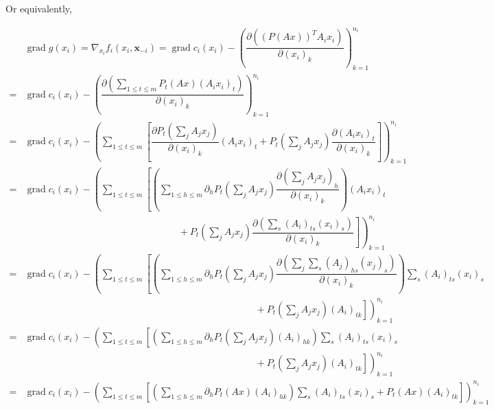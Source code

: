 Or equivalently,

\begingroup
\allowdisplaybreaks
\begin{align*}
& \operatorname{grad} g(x_i) = \nabla_{x_i} f_i(x_i, \mathbf{x}_{-i}) = \operatorname{grad} c_i(x_i) - \left( \dfrac{\partial \left( (P(Ax))^T A_ix_i \right)}{\partial (x_i)_k} \right)_{k=1}^{n_i} \\
= & \operatorname{grad} c_i(x_i) - \left( \dfrac{\partial \left( \sum\limits_{1\leqslant t \leqslant m} P_t(Ax) (A_ix_i)_t \right)}{\partial (x_i)_k} \right)_{k=1}^{n_i} \\
= & \operatorname{grad} c_i(x_i) - \left( \sum\limits_{1\leqslant t \leqslant m} \left[ \dfrac{\partial P_t \left( \sum\limits_j A_jx_j \right)}{\partial (x_i)_k} (A_ix_i)_t + P_t \left( \sum\limits_j A_jx_j \right) \dfrac{\partial (A_ix_i)_t}{\partial (x_i)_k} \right] \right)_{k=1}^{n_i} \\
= & \operatorname{grad} c_i(x_i) - \left( \sum\limits_{1\leqslant t \leqslant m} \left[ \left( \sum\limits_{1\leqslant h \leqslant m} \partial_h P_t\left( \sum\limits_j A_jx_j \right) \dfrac{\partial \left( \sum\limits_j A_jx_j \right)_h}{\partial (x_i)_k} \right) (A_ix_i)_t \right.\right. \\
& \left.\left. \hspace{16em} + P_t \left( \sum\limits_j A_jx_j \right) \dfrac{\partial \left( \sum\limits_{s} (A_i)_{ts} (x_i)_s \right)}{\partial (x_i)_k} \right] \right)_{k=1}^{n_i} \\
= & \operatorname{grad} c_i(x_i) - \left( \sum\limits_{1\leqslant t \leqslant m} \left[ \left( \sum\limits_{1\leqslant h \leqslant m} \partial_h P_t\left( \sum\limits_j A_jx_j \right) \dfrac{\partial \left( \sum\limits_j\sum\limits_s (A_j)_{hs} (x_j)_s \right)}{\partial (x_i)_k} \right) \sum\limits_s (A_i)_{ts} (x_i)_s \right.\right. \\
& \left.\left. \hspace{24em} + P_t \left( \sum\limits_j A_jx_j \right) (A_i)_{tk} \right] \right)_{k=1}^{n_i} \\
= & \operatorname{grad} c_i(x_i) - \left( \sum\limits_{1\leqslant t \leqslant m} \left[ \left( \sum\limits_{1\leqslant h \leqslant m} \partial_h P_t\left( \sum\limits_j A_jx_j \right) (A_i)_{hk} \right) \sum\limits_s (A_i)_{ts} (x_i)_s \right.\right. \\
& \left.\left. \hspace{24em} + P_t \left( \sum\limits_j A_jx_j \right) (A_i)_{tk} \right] \right)_{k=1}^{n_i} \\
= & \operatorname{grad} c_i(x_i) - \left( \sum\limits_{1\leqslant t \leqslant m} \left[ \left( \sum\limits_{1\leqslant h \leqslant m} \partial_h P_t\left( Ax \right) (A_i)_{hk} \right) \sum\limits_s (A_i)_{ts} (x_i)_s + P_t \left( Ax \right) (A_i)_{tk} \right] \right)_{k=1}^{n_i}
\end{align*}
\endgroup

\printbibliography
